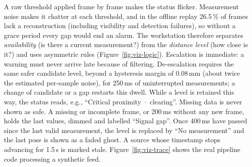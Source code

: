 A raw threshold applied frame by frame makes the status flicker. Measurement noise
makes it chatter at each threshold, and in the offline replay 26.5\,\% of frames
lack a reconstruction (including visibility and detection failures), so without
a grace period every gap would end an alarm. The workstation therefore separates
\emph{availability} (is there a current measurement?) from the \emph{distance
level} (how close is it?) and uses asymmetric rules (Figure~\ref{fig:viz-logic}).
Escalation is immediate: a warning must never arrive late because of filtering.
De-escalation requires the same safer candidate level, beyond a hysteresis margin
of 0.08\,mm (about twice the estimated per-sample noise), for 250\,ms of
uninterrupted measurements; a change of candidate or a gap restarts this dwell.
While a level is retained this way, the status reads, e.g., ``Critical proximity~$\cdot$~clearing''. Missing data is never shown as
safe. A missing or incomplete frame, or 200\,ms without any new frame, holds the
last values, dimmed and labelled ``Signal gap''. Once 400\,ms have passed since
the last valid measurement, the level is replaced by ``No measurement'' and the
last pose is shown as a faded ghost. A source whose timestamp stops advancing for
1.5\,s is marked stale. Figure~\ref{fig:viz-trace} shows the real pipeline code
processing a synthetic feed.

